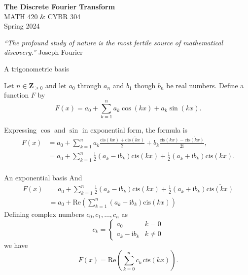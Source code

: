 \documentclass[portrait,fleqn,12pt]{beamer}
\newcommand{\integers}{\mathbf{Z}}
\newcommand{\cis}{\mathrm{cis}}
\newcommand{\imag}{\mathrm{i}}
\newcommand{\re}{\mathrm{Re}}
\begin{document}
\begin{frame}
\begin{flushleft} 
\textbf{The Discrete Fourier Transform} \\
MATH 420 \& CYBR 304 \\
Spring 2024 
\end{flushleft}

\emph{“The profound study of nature is the most fertile source of mathematical discovery.”} \hfill{\sc  Joseph Fourier}

\end{frame}


\begin{frame}{A trigonometric basis}  


Let $n \in \integers_{\geq 0}$ and let $a_0$ through $a_n$ and $b_1$ though $b_n$ be real numbers.  Define a function $F$ by 
\begin{equation*}
F(x) = a_0 + \sum_{k=1}^n a_k \cos(k x) +  a_k \sin(k x).
\end{equation*}

Expressing $\cos$ and $\sin$ in exponential form, the formula is 
\begin{align*}
F(x) &= a_0 + \sum_{k=1}^n a_k  \frac{\cis(k x) +  \overline{\cis(k x)}}{2} + b_k  \frac{\cis(k x) -  \overline{\cis(k x)}}{2 \imag}, \\
       & = a_0 + \sum_{k=1}^n \frac{1}{2} (a_k  - \imag b_k) \cis(k x) +   \frac{1}{2} (a_k  + \imag b_k) \overline{\cis(k x) } .  \\
\end{align*}
\end{frame}

\begin{frame}{An exponential basis}
And
\begin{align*}
F(x)   & = a_0 + \sum_{k=1}^n \frac{1}{2} (a_k  - \imag b_k) \cis(k x) +   \frac{1}{2} (a_k  + \imag b_k) \overline{\cis(k x) }   \\
          &= a_0 + \re  \left ( \sum_{k=1}^n (a_k  - \imag b_k) \cis(k x) \right)
\end{align*}
Defining complex numbers $c_0, c_1, \dots, c_n $ as
\begin{equation*}
  c_k = \begin{cases} a_0  & k =0 \\ a_k  - \imag b_k & k \neq 0 \end{cases}
\end{equation*}
we have
\begin{equation*}
F(x)    = \re  \left ( \sum_{k=0}^n c_k  \, \cis(k x) \right).
\end{equation*}
\end{frame}
\end{document}
